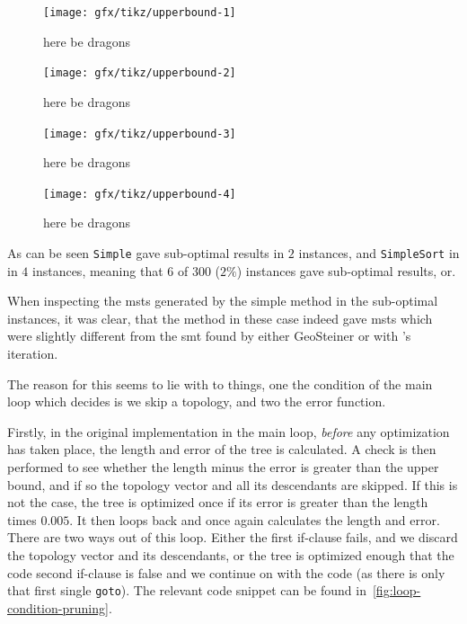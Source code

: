 \begin{figure}[htbp]
  \centering
  \texttt{[image: gfx/tikz/upperbound-1]}
  \caption[here be dragons]{here be dragons}
\end{figure}

\begin{figure}[htbp]
  \centering
  \texttt{[image: gfx/tikz/upperbound-2]}
  \caption[here be dragons]{here be dragons}
\end{figure}

\begin{figure}[htbp]
  \centering
  \texttt{[image: gfx/tikz/upperbound-3]}
  \caption[here be dragons]{here be dragons}
\end{figure}

\begin{figure}[htbp]
  \centering
  \texttt{[image: gfx/tikz/upperbound-4]}
  \caption[here be dragons]{here be dragons}
\end{figure}

As can be seen \texttt{Simple} gave sub-optimal results in $2$ instances, and
\texttt{SimpleSort} in in $4$ instances, meaning that $6$ of $300$ ($2\%$) instances
gave sub-optimal results, or.

When inspecting the \acp{mst} generated by the simple method in the sub-optimal
instances, it was clear, that the method in these case indeed gave \acp{mst}
which were slightly different from the \ac{smt} found by either GeoSteiner or
with \citeauthor{smith1992}'s iteration. 

The reason for this seems to lie with to things, one the condition of the main
loop which decides is we skip a topology, and two the error function.

Firstly, in the original implementation in the main loop, \textit{before} any
optimization has taken place, the length and error of the tree is calculated. A
check is then performed to see whether the length minus the error is greater
than the upper bound, and if so the topology vector and all its descendants are
skipped. If this is not the case, the tree is optimized once if its error is
greater than the length times $0.005$. It then loops back and once again
calculates the length and error. There are two ways out of this loop. Either the
first if-clause fails, and we discard the topology vector and its descendants,
or the tree is optimized enough that the code second if-clause is false and we
continue on with the code (as there is only that first single \texttt{goto}).
The relevant code snippet can be found in~\cref{fig:loop-condition-pruning}. 

